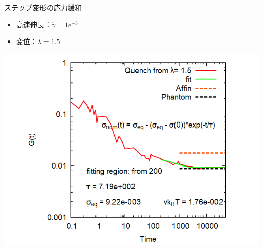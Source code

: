 \documentclass[12pt, dvipdfmx]{beamer}
\begin{document}
\begin{frame}
\begin{columns}[totalwidth=\linewidth]
\begin{exampleblock}{ステップ変形の応力緩和}
\begin{itemize}
                        \item 高速伸長：$\dot{\gamma} = 1e^{-3}$
                        \item 変位：$\lambda = 1.5$
                    \end{itemize}
					\begin{center}
                        \includegraphics[width=.9\columnwidth]{gt_sunuke.png}
                    \end{center}
				\end{exampleblock}
		\end{columns}
\end{frame}


\end{document}
